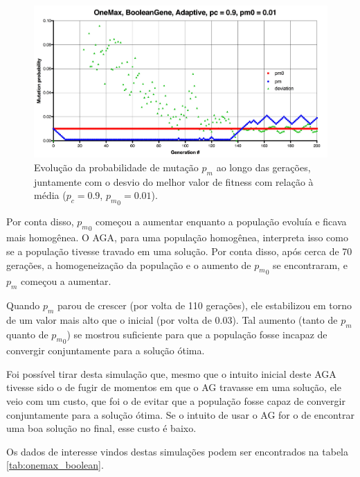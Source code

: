 \begin{figure}[ht!]
    \centering \includegraphics[width=1.0\textwidth]{onemax_boolean_adaptive_pm.jpg}
    \caption{Evolução da probabilidade de mutação $p_m$ ao longo das gerações, juntamente com o desvio do melhor valor de fitness com relação à média ($p_c=0.9$, ${p_m}_0=0.01$).}
    \label{fig:onemax_boolean_adaptive_pm}
\end{figure}

Por conta disso, ${p_m}_0$ começou a aumentar enquanto a população evoluía e ficava mais homogênea. O AGA, para uma população homogênea, interpreta isso como se a população tivesse travado em uma solução. Por conta disso, após cerca de 70 gerações, a homogeneização da população e o aumento de ${p_m}_0$ se encontraram, e $p_m$ começou a aumentar.

Quando $p_m$ parou de crescer (por volta de 110 gerações), ele estabilizou em torno de um valor mais alto que o inicial (por volta de 0.03). Tal aumento (tanto de $p_m$ quanto de ${p_m}_0$) se mostrou suficiente para que a população fosse incapaz de convergir conjuntamente para a solução ótima.

Foi possível tirar desta simulação que, mesmo que o intuito inicial deste AGA tivesse sido o de fugir de momentos em que o AG travasse em uma solução, ele veio com um custo, que foi o de evitar que a população fosse capaz de convergir conjuntamente para a solução ótima. Se o intuito de usar o AG for o de encontrar uma boa solução no final, esse custo é baixo.

Os dados de interesse vindos destas simulações podem ser encontrados na tabela \ref{tab:onemax_boolean}.

